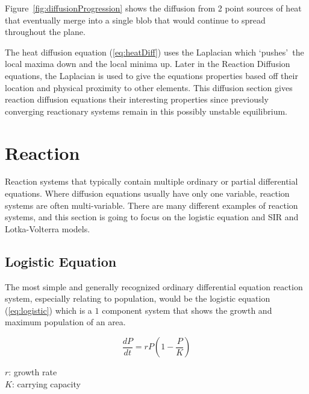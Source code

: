 \documentclass[12pt, letterpaper]{article}
\newcommand{\sorta}[1]{\lq #1\rq \,}
\begin{document}
Figure~\ref{fig:diffusionProgression} shows the diffusion from 2 point sources of heat that eventually
merge into a single blob that would continue to spread throughout the plane.

The heat diffusion equation (\ref{eq:heatDiff}) uses the Laplacian which \sorta{pushes} the local maxima 
down 
and the local minima up. Later in the Reaction Diffusion equations, the Laplacian is used to give the
equations properties based off their location and physical proximity to other elements. This diffusion
section gives reaction diffusion equations their interesting properties since previously converging
reactionary systems remain in this possibly unstable equilibrium. 

\section{Reaction} \label{reaction}
Reaction systems that typically contain multiple ordinary or partial differential 
equations. Where diffusion equations usually have only one variable, reaction systems are often 
multi-variable. There are many different examples of reaction systems, and this section is going to focus on
the logistic equation and SIR and Lotka-Volterra models.

\subsection{Logistic Equation} \label{logistic}

The most simple and generally recognized ordinary differential equation reaction system, especially relating
to population, would be the logistic equation (\ref{eq:logistic}) which is a $1$ component system that shows
the growth and maximum population of an area.

\begin{singlespace}
  \begin{equation}\label{eq:logistic}
    \frac{dP}{dt} = rP (1 - \frac{P}{K})
  \end{equation}
  \begin{small}
$r$: growth rate \\
$K$: carrying capacity
  \end{small}
\end{singlespace}
\end{document}
